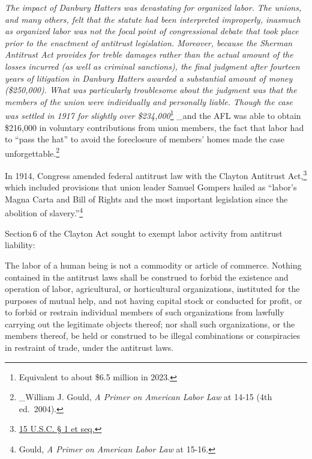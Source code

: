 \documentclass[
  letterpaper,
  11pt,
  DIV=9,
  openright]{scrbook}
\renewenvironment{quote}{
  \list{}{\leftmargin=2em\rightmargin=2em}
  \item\relax\small
}
{\endlist}
\begin{document}
\begin{quote}
\emph{The impact of Danbury Hatters was devastating for organized labor.
The unions, and many others, felt that the statute had been interpreted
improperly, inasmuch as organized labor was not the focal point of
congressional debate that took place prior to the enactment of antitrust
legislation. Moreover, because the Sherman Antitrust Act provides for
treble damages rather than the actual amount of the losses incurred (as
well as criminal sanctions), the final judgment after fourteen years of
litigation in Danbury Hatters awarded a substantial amount of money
(\$250,000). What was particularly troublesome about the judgment was
that the members of the union were individually and personally liable.
Though the case was settled in 1917 for slightly over
\$234,000}\footnote{Equivalent to about \$6.5 million in 2023.} \_and
the AFL was able to obtain \$216,000 in voluntary contributions from
union members, the fact that labor had to ``pass the hat'' to avoid the
foreclosure of members' homes made the case unforgettable.\footnote{\_William
  J. Gould, \emph{A Primer on American Labor Law} at 14-15 (4th
  ed.~2004).}
\end{quote}

In 1914, Congress amended federal antitrust law with the Clayton
Antitrust Act,\footnote{\href{https://www.law.cornell.edu/uscode/text/15/chapter-1}{15
  U.S.C. § 1 et seq.}} which included provisions that union leader
Samuel Gompers hailed as ``labor's Magna Carta and Bill of Rights and
the most important legislation since the abolition of
slavery.''\footnote{Gould, \emph{A Primer on American Labor Law} at
  15-16.}

Section\,6 of the Clayton Act sought to exempt labor activity from
antitrust liability:

\begin{quote}
The labor of a human being is not a commodity or article of commerce.
Nothing contained in the antitrust laws shall be construed to forbid the
existence and operation of labor, agricultural, or horticultural
organizations, instituted for the purposes of mutual help, and not
having capital stock or conducted for profit, or to forbid or restrain
individual members of such organizations from lawfully carrying out the
legitimate objects thereof; nor shall such organizations, or the members
thereof, be held or construed to be illegal combinations or conspiracies
in restraint of trade, under the antitrust laws.
\end{quote}
\end{document}
